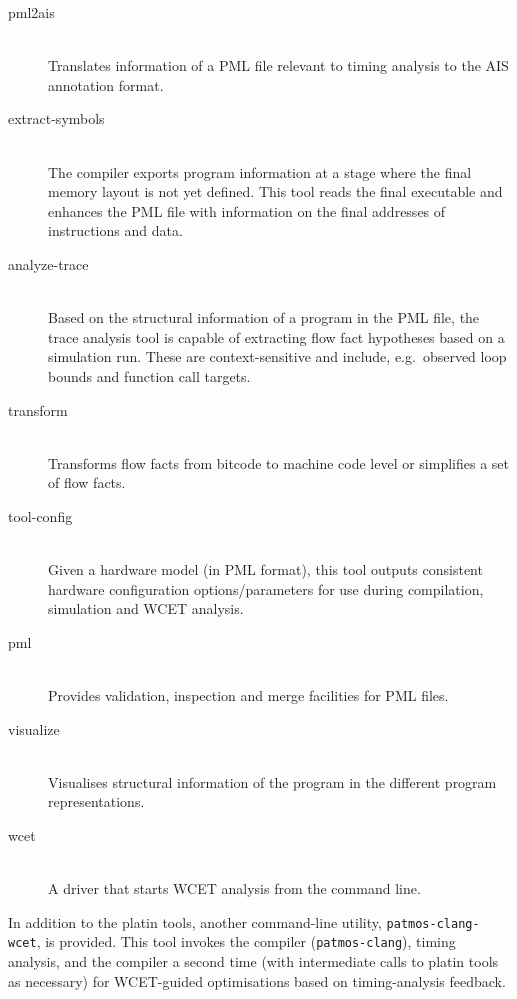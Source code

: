 \begin{description}

  \item[pml2ais] \hfill\\
    Translates information of a PML file relevant to timing analysis to
    the AIS annotation format.

  \item[extract-symbols] \hfill\\
    The compiler exports program information at a stage where the final memory
    layout is not yet defined. This tool reads the final executable and
    enhances the PML file with information on the final addresses of
    instructions and data.

  \item[analyze-trace] \hfill\\
    Based on the structural information of a program in the PML file,
    the trace analysis tool is capable of extracting flow fact hypotheses
    based on a simulation run. These are context-sensitive and include,
    e.g.\ observed loop bounds and function call targets.

  \item[transform] \hfill\\
    Transforms flow facts from bitcode to machine code level
    or simplifies a set of flow facts.

  \item[tool-config] \hfill\\
    Given a hardware model (in PML format), this tool outputs consistent
    hardware configuration options/parameters for use during compilation,
    simulation and WCET analysis.

  \item[pml] \hfill\\
    Provides validation, inspection and merge facilities for PML files.

  \item[visualize] \hfill\\
    Visualises structural information of the program in the different program
    representations.

  \item[wcet] \hfill\\
    A driver that starts WCET analysis from the command line.

\end{description}


In addition to the platin tools, another command-line utility,
\texttt{patmos-clang-wcet}, is provided. This tool invokes the compiler
(\texttt{patmos-clang}), timing analysis, and the compiler a second time
(with intermediate calls to platin tools as necessary) for WCET-guided
optimisations based on timing-analysis feedback.


